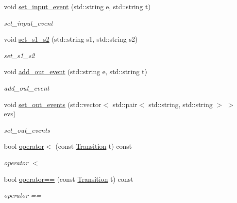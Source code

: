 \begin{DoxyCompactItemize}
void \hyperlink{class_transition_a4b220aa7b2001942e23ab15075f1aa31}{set\+\_\+input\+\_\+event} (std\+::string e, std\+::string t)
\begin{DoxyCompactList}\small\item\em set\+\_\+input\+\_\+event \end{DoxyCompactList}\item 
void \hyperlink{class_transition_ae5aafaf781f86a2cdd5e72fb19d97f5f}{set\+\_\+s1\+\_\+s2} (std\+::string s1, std\+::string s2)
\begin{DoxyCompactList}\small\item\em set\+\_\+s1\+\_\+s2 \end{DoxyCompactList}\item 
void \hyperlink{class_transition_a2520c6cc0f7e6607341f6d8f20e45d28}{add\+\_\+out\+\_\+event} (std\+::string e, std\+::string t)
\begin{DoxyCompactList}\small\item\em add\+\_\+out\+\_\+event \end{DoxyCompactList}\item 
void \hyperlink{class_transition_acf51ad82dfa53f630e34f8c61cc3fbfb}{set\+\_\+out\+\_\+events} (std\+::vector$<$ std\+::pair$<$ std\+::string, std\+::string $>$ $>$ evs)
\begin{DoxyCompactList}\small\item\em set\+\_\+out\+\_\+events \end{DoxyCompactList}\item 
bool \hyperlink{class_transition_abb05ffb0eafbc0b97a478e7a3a266609}{operator$<$} (const \hyperlink{class_transition}{Transition} t) const 
\begin{DoxyCompactList}\small\item\em operator $<$ \end{DoxyCompactList}\item 
bool \hyperlink{class_transition_af76ce33a5b0b44fbd87c17e872d32d8c}{operator==} (const \hyperlink{class_transition}{Transition} t) const 
\begin{DoxyCompactList}\small\item\em operator == \end{DoxyCompactList}\end{DoxyCompactItemize}
